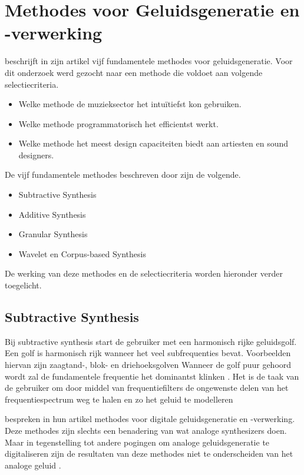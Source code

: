 \section{Methodes voor Geluidsgeneratie en -verwerking}

\textcite{methodes} beschrijft in zijn artikel vijf fundamentele methodes voor geluidsgeneratie. Voor dit onderzoek werd gezocht naar een methode die voldoet aan volgende selectiecriteria.

\begin{itemize}
    \item Welke methode de muzieksector het intuïtiefst kon gebruiken.
    \item Welke methode programmatorisch het efficientst werkt.
    \item Welke methode het meest design capaciteiten biedt aan artiesten en sound designers.
\end{itemize}{}

De vijf fundamentele methodes beschreven door \textcite{methodes} zijn de volgende.

\begin{itemize}
    \item Subtractive Synthesis
    \item Additive Synthesis
    \item Granular Synthesis
    \item Wavelet en Corpus-based Synthesis
\end{itemize}{}

De werking van deze methodes en de selectiecriteria worden hieronder verder toegelicht.

\subsection{Subtractive Synthesis}

Bij subtractive synthesis start de gebruiker met een harmonisch rijke geluidsgolf. Een golf is harmonisch rijk wanneer het veel subfrequenties bevat. Voorbeelden hiervan zijn zaagtand-, blok- en driehoeksgolven Wanneer de golf puur gehoord wordt zal de fundamentele frequentie het dominantst klinken \autocite{harmonics}. Het is de taak van de gebruiker om door middel van frequentiefilters de ongewenste delen van het frequentiespectrum weg te halen en zo het geluid te modelleren \autocite{subtractive}

\textcite{subtractive} bespreken in hun artikel methodes voor digitale geluidsgeneratie en -verwerking. Deze methodes zijn slechts een benadering van wat analoge synthesizers doen. Maar in tegenstelling tot andere pogingen om analoge geluidsgeneratie te digitaliseren zijn de resultaten van deze methodes niet te onderscheiden van het analoge geluid \autocite{subtractive}.

